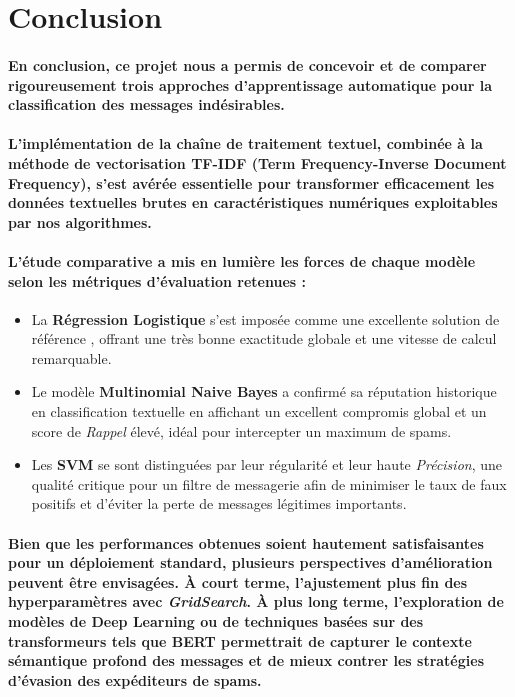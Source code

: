 \documentclass[a4paper,12pt]{article}
\begin{document}
\section{Conclusion}
\paragraph{
En conclusion, ce projet nous a permis de concevoir et de comparer rigoureusement trois approches d'apprentissage automatique pour la classification des messages indésirables.}
\paragraph{L'implémentation de la chaîne de traitement textuel, combinée à la méthode de vectorisation \textbf{TF-IDF} (Term Frequency-Inverse Document Frequency), s'est avérée essentielle pour transformer efficacement les données textuelles brutes en caractéristiques numériques exploitables par nos algorithmes.
}

\paragraph{L'étude comparative a mis en lumière les forces de chaque modèle selon les métriques d'évaluation retenues :}
\begin{itemize}
    \item La \textbf{Régression Logistique} s'est imposée comme une excellente solution de référence , offrant une très bonne exactitude globale et une vitesse de calcul remarquable.
    \item Le modèle \textbf{Multinomial Naive Bayes} a confirmé sa réputation historique en classification textuelle en affichant un excellent compromis global et un score de \textit{Rappel} élevé, idéal pour intercepter un maximum de spams.
    \item Les \textbf{SVM} se sont distinguées par leur régularité et leur haute \textit{Précision}, une qualité critique pour un filtre de messagerie afin de minimiser le taux de faux positifs et d'éviter la perte de messages légitimes importants.
\end{itemize}

\paragraph{
Bien que les performances obtenues soient hautement satisfaisantes pour un déploiement standard, plusieurs perspectives d'amélioration peuvent être envisagées. À court terme, l'ajustement plus fin des hyperparamètres avec \textit{GridSearch}. À plus long terme, l'exploration de modèles de Deep Learning ou de techniques basées sur des transformeurs tels que BERT permettrait de capturer le contexte sémantique profond des messages et de mieux contrer les stratégies d'évasion des expéditeurs de spams.
}
\end{document}
